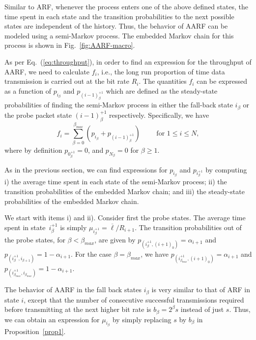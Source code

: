\documentclass[11pt, journal, letterpaper, oneside, onecolumn]{IEEEtran}
\begin{document}
Similar to ARF, whenever the process enters one of the above
defined states, the time spent in each state and the transition
probabilities to the next possible states are independent of the
history. Thus, the behavior of AARF can be modeled using a
semi-Markov process. The embedded Markov chain for this process is
shown in Fig.~\ref{fig:AARF-macro}.










As per Eq.~(\ref{eq:throughput}), in order to find an expression
for the throughput of AARF, we need to calculate $f_{i}$, i.e.,
the long run proportion of time data transmission is carried out
at the bit rate $R_{i}$. The quantities $f_{i}$ can be expressed
as a function of $p_{i_{\beta}}$ and $p_{(i-1)^{+1}_{\beta}}$
which are defined as the steady-state probabilities of finding the
semi-Markov process in either the fall-back state $i_{\beta}$ or
the probe packet state $(i-1)^{+1}_{\beta}$ respectively.
Specifically, we have
\begin{equation}\label{eq:f_AARF}
f_{i}=\sum_{\beta=0}^{\beta_{max}}(p_{i_{\beta}}+p_{(i-1)^{+1}_{\beta}})
\qquad \mbox{ for } 1 \leq i \leq N,
\end{equation}
where by definition $p_{{0}^{+1}_{\beta}}=0$, and
$p_{N_{\beta}}=0$ for $\beta \geq 1$.

As in the previous section, we can find expressions for
$p_{i_{\beta}}$ and $p_{i^{+1}_{\beta}}$ by computing i) the
average time spent in each state of the semi-Markov process; ii)
the transition probabilities of the embedded Markov chain; and
iii) the steady-state probabilities of the embedded Markov chain.


We start with items i) and ii). Consider first the probe states. The
average time spent in state~$i^{+1}_{\beta}$  is simply
$\mu_{i^{+1}_{\beta}}=\overline{\ell}/R_{i+1}$.
The transition probabilities out of the probe states, for $\beta < \beta_{max}$, are given by
$p_{(i^{+1}_{\beta},(i+1)_0)}  =
\alpha_{i+1}$ and
$p_{(i^{+1}_{\beta},i_{\beta+1})}  =  1-\alpha_{i+1}$.
For the case $\beta=\beta_{max}$, we have
$p_{(i^{+1}_{\beta_{max}},(i+1)_0)} = \alpha_{i+1}$ and
$p_{(i^{+1}_{\beta_{max}},i_{\beta_{max}})} =  1-\alpha_{i+1}$.

The behavior of AARF in the fall back states ${i_{\beta}}$ is very
similar to that of ARF in state $i$, except that the number of
consecutive successful transmissions required before transmitting
at the next higher bit rate is $b_{\beta}={2^\beta} s$ instead of
just $s$. Thus, we can obtain an expression for $\mu_{i_{\beta}}$ by simply replacing $s$ by $b_{\beta}$ in Proposition~\ref{prop1}.
\end{document}
